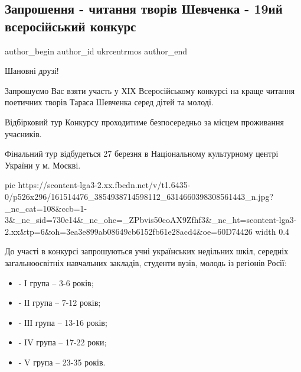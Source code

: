  
 
 
 
 
 
\subsection{Запрошення - читання творів Шевченка - 19ий всеросійський конкурс}
\label{sec:17_03_2021.fb.ukrcentrmos.1.priglashenie_konkurs_shevchenko}
\ifcmt
 author_begin
   author_id ukrcentrmos
 author_end
\fi

Шановні друзі!

Запрошуємо Вас взяти участь у ХІХ Всеросійському конкурсі на краще читання поетичних творів Тараса Шевченка серед дітей та молоді.

Відбірковий тур Конкурсу проходитиме безпосередньо за місцем проживання учасників.

Фінальний тур відбудеться 27 березня в Національному культурному центрі України у м. Москві.

\ifcmt
  pic https://scontent-lga3-2.xx.fbcdn.net/v/t1.6435-0/p526x296/161514476_3854938714598112_6314660398308561443_n.jpg?_nc_cat=108&ccb=1-3&_nc_sid=730e14&_nc_ohc=_ZPbvis50coAX9Zfhf3&_nc_ht=scontent-lga3-2.xx&tp=6&oh=3ea3e899ab08649cb6152fb61e28acd4&oe=60D74426
	width 0.4
\fi

До участі в конкурсі запрошуються учні українських недільних шкіл, середніх
загальноосвітніх навчальних закладів, студенти вузів, молодь із регіонів Росії:

\begin{itemize}
  \item - І група – 3-6 років;
  \item - ІІ група – 7-12 років;
  \item - ІІІ група – 13-16 років;
  \item - IV група – 17-22 роки;
  \item - V група – 23-35 років.
\end{itemize}

